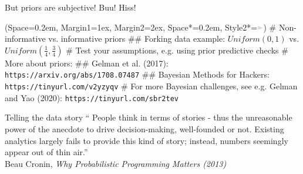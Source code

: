 \documentclass[12pt, aspectratio=149]{beamer}
\newcommand{\listSpace}{0.2em}
\theoremstyle{plain}
\begin{document}
\begin{frame}[fragile]{But priors are subjective! Buu! Hiss!}
	\begin{easylist}
		\ListProperties(Space=\listSpace, Margin1=1ex, Margin2=2ex, Space*=\listSpace, Style2*=$\color{bggraydark}\blacktriangleright$\space)
		# Non-informative vs. informative priors
		## Forking data example: $Uniform(0, 1)$ vs. $Uniform(\frac{1}{4}, \frac{3}{4})$
		# Test your assumptions, e.g. using prior predictive checks
		# More about priors:
		## Gelman et al. (2017): \footnotesize\texttt{https://arxiv.org/abs/1708.07487}
		## Bayesian Methods for Hackers: \footnotesize\texttt{https://tinyurl.com/v2yzyqv}	
		# For more Bayesian challenges, see e.g. Gelman and Yao (2020): \footnotesize\texttt{https://tinyurl.com/sbr2tev}
	\end{easylist}
\end{frame}

\begin{frame}[fragile]{Telling the data story}
	`` People think in terms of stories - thus the unreasonable power of the anecdote to drive decision-making, well-founded or not. Existing analytics largely fails to provide this kind of story; instead, numbers seemingly appear out of thin air.'' \\
	\flushright Beau Cronin, \textit{Why Probabilistic Programming Matters (2013)}
\end{frame}
\end{document}
